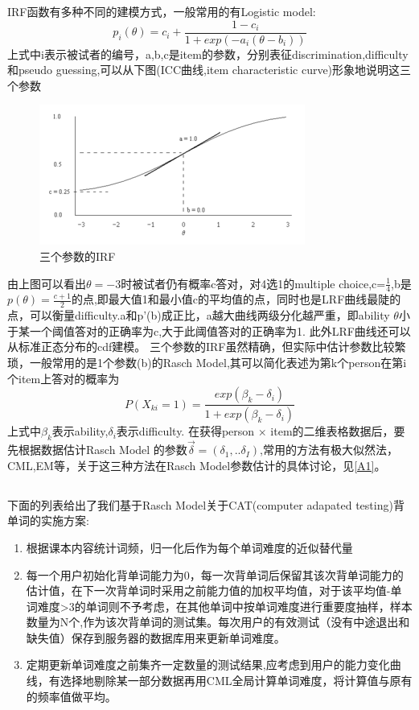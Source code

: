 \documentclass[12pt]{article}
\begin{document}
IRF函数有多种不同的建模方式，一般常用的有Logistic model:
\begin{equation}
p_i(\theta)=c_i+\frac{1-c_i}{1+exp(-a_i(\theta-b_i))}
\end{equation}
上式中i表示被试者的编号，a,b,c是item的参数，分别表征discrimination,difficulty和pseudo guessing,可以从下图(ICC曲线,item characteristic curve)形象地说明这三个参数
\begin{figure}
\caption{三个参数的IRF}
\includegraphics[width=\linewidth]{3PL_IRF.png}
\end{figure}
由上图可以看出$\theta=-3$时被试者仍有概率c答对，对4选1的multiple choice,c=$\frac{1}{4}$,b是$p(\theta)=\frac{c+1}{2}$的点,即最大值1和最小值c的平均值的点，同时也是LRF曲线最陡的点，可以衡量difficulty.a和p'(b)成正比，a越大曲线两级分化越严重，即ability $\theta$小于某一个阈值答对的正确率为c,大于此阈值答对的正确率为1.
此外LRF曲线还可以从标准正态分布的cdf建模。
三个参数的IRF虽然精确，但实际中估计参数比较繁琐，一般常用的是1个参数(b)的Rasch Model,其可以简化表述为第k个person在第i个item上答对的概率为
\begin{equation}\label{eq:Rasch}
P(X_{ki}=1)=\frac{exp(\beta_k-\delta_i)}{1+exp(\beta_k-\delta_i)}
\end{equation}
上式中$\beta_k$表示ability,$\delta_i$表示difficulty.
在获得person $\times$ item的二维表格数据后，要先根据数据估计Rasch Model 的参数$\vec{\delta}=(\delta_1,..\delta_I)$,常用的方法有极大似然法，CML,EM等，关于这三种方法在Rasch Model参数估计的具体讨论，见\ref{A1}。
\subsection{\textbf{}}
下面的列表给出了我们基于Rasch Model关于CAT(computer adapated testing)背单词的实施方案:
\begin{enumerate}
\item{根据课本内容统计词频，归一化后作为每个单词难度的近似替代量}
\item{每一个用户初始化背单词能力为0，每一次背单词后保留其该次背单词能力的估计值，在下一次背单词时采用之前能力值的加权平均值，对于该平均值-单词难度>3的单词则不予考虑，在其他单词中按单词难度进行重要度抽样，样本数量为N个,作为该次背单词的测试集。每次用户的有效测试（没有中途退出和缺失值）保存到服务器的数据库用来更新单词难度。}
\item{定期更新单词难度之前集齐一定数量的测试结果,应考虑到用户的能力变化曲线，有选择地剔除某一部分数据再用CML全局计算单词难度，将计算值与原有的频率值做平均。}
\end{enumerate}
\end{document}
